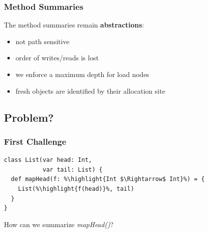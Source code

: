 \documentclass[hyperref={pdfpagelabels=false}]{beamer}
\newcommand\highlight[1]{\color{red}{#1}}
\begin{document}
\begin{frame}[fragile]
\frametitle{Method Summaries}
    The method summaries remain \textbf{abstractions}:
    \begin{itemize}
        \item not path sensitive
        \item order of writes/reads is lost
        \item we enforce a maximum depth for load nodes
        \item fresh objects are identified by their allocation site

    \end{itemize}
\end{frame}

\subsection{Problem?}
\begin{frame}[fragile]
\frametitle{First Challenge}
\begin{lstlisting}[escapechar=\%]
class List(var head: Int,
           var tail: List) {
  def mapHead(f: %\highlight{Int $\Rightarrow$ Int}%) = {
    List(%\highlight{f(head)}%, tail)
  }
}
\end{lstlisting}

    \vspace{10pt}
    How can we summarize \emph{mapHead()}?
\end{frame}

%
\end{document}
